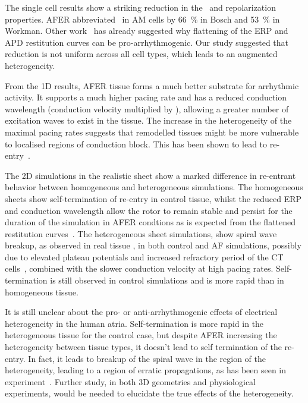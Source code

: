 The single cell results show a striking reduction in the \apd\ and
repolarization properties.
AFER abbreviated \apd\ in AM cells by 66~\% in Bosch and 53~\% in Workman.
Other work~\cite{Xie2002,ByungSoo2002,Karma1994,Tusscher2006} has already suggested why flattening of
the ERP and APD restitution curves can be pro-arrhythmogenic.
Our study suggested that reduction is not uniform across all cell types, which
leads to an augmented heterogeneity.

From the 1D results, AFER tissue forms a much better substrate for arrhythmic
activity.
It supports a much higher pacing rate and has a reduced conduction wavelength
(conduction velocity multiplied by \apd), allowing a greater number of
excitation waves to exist in the tissue.
The increase in the heterogeneity of the maximal pacing rates suggests that
remodelled tissues might be more vulnerable to localised regions of conduction
block.
This has been shown to lead to re-entry~\cite{Xie2001a}.

The 2D simulations in the realistic sheet show a marked difference in
re-entrant behavior between homogeneous and heterogeneous simulations.
The homogeneous sheets show self-termination of re-entry in control
tissue, whilst the reduced ERP and conduction wavelength allow the rotor
to remain stable and persist for the duration of the simulation in AFER
condtions as is expected from the flattened restitution
curves~\cite{Xie2002,Karma1994}.
The heterogeneous sheet simulations, show spiral wave
breakup, as observed in real tissue \cite{Kumagai1997}, in both control
and AF simulations, possibly due to elevated plateau potentials and
increased refractory period of the CT cells~\cite{Clayton2005}, combined with
the slower conduction velocity at high pacing rates.
Self-termination is still observed in control simulations and is more rapid than
in homogeneous tissue.

It is still unclear about the pro- or anti-arrhythmogenic effects of
electrical heterogeneity in the human atria.  Self-termination is more
rapid in the heterogeneous tissue for the control case, but despite AFER
increasing the heterogeneity between tissue types, it doesn't lead to
self termination of the re-entry.  In fact, it leads to breakup of the
spiral wave in the region of the heterogeneity, leading to a region of
erratic propagations, as has been seen in experiment~\cite{Kumagai1997}.
Further study, in both 3D geometries and physiological experiments,
would be needed to elucidate the true effects of the heterogeneity.

